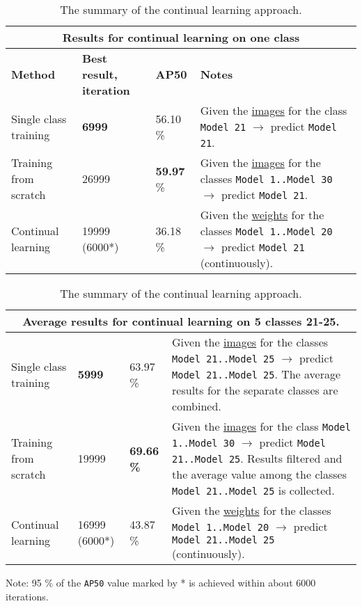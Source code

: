 \begin{table}
\centering
\caption{The summary of the continual learning approach.}\label{summary_table_2} 
\begin{tabularx}{\textwidth}{|p{1.5cm}|p{1.5cm}|p{1.5cm}|X|} 
 \hline
\multicolumn{4}{c}{\textbf{Results for continual learning on one class}} \\ \hline
\textbf{Method} & \textbf{Best result, iteration} & \textbf{AP50} & \textbf{Notes} \\
\hline
Single class training & \textbf{6999} & 56.10 \% & \multicolumn{1}{m{9cm}|}{Given the \uline{images} for the class \texttt{Model 21} $\rightarrow$ predict \texttt{Model 21}.} \\ 
\hline
Training from scratch  & 26999 & \textbf{59.97} \% & \multicolumn{1}{m{9cm}|}{Given the \uline{images} for the classes \texttt{Model 1..Model 30} $\rightarrow$ predict \texttt{Model 21}.} \\ 
\hline
Continual learning & 19999 (6000*) & 36.18 \% & \multicolumn{1}{m{9cm}|}{Given the \uline{weights} for the classes  \texttt{Model 1..Model 20} $\rightarrow$ predict \texttt{Model 21} (continuously).} \\ 
\hline  
\end{tabularx} 
\begin{tabularx}{\textwidth}{|p{1.5cm}|p{1.5cm}|p{1.5cm}|X|} 
\multicolumn{4}{c}{\textbf{Average results for continual learning on 5 classes 21-25}.} \\ 
\hline
Single class training  & \textbf{5999} & 63.97 \% & \multicolumn{1}{m{9cm}|}{Given the \uline{images} for the classes \texttt{Model 21..Model 25} $\rightarrow$ predict \texttt{Model 21..Model 25}. The average results for the  separate classes are combined.} \\ 
\hline
Training from scratch & 19999 & \textbf{69.66 \%} & \multicolumn{1}{m{9cm}|}{Given the \uline{images} for the class \texttt{Model 1..Model 30} $\rightarrow$ predict \texttt{Model 21..Model 25}. Results filtered and the average value among the classes \texttt{Model 21..Model 25} is collected.} \\ 
\hline
Continual learning & 16999 (6000*) & 43.87 \% & \multicolumn{1}{m{9cm}|}{Given the \uline{weights} for the classes \texttt{Model 1..Model 20} $\rightarrow$ predict \texttt{Model 21..Model 25} (continuously). } \\ 
\hline      
\end{tabularx}
\begin{tablenotes}
\small
\item Note: 95 \% of the \texttt{AP50} value marked by * is achieved within about 6000 iterations.
\end{tablenotes}
\end{table}
\FloatBarrier 


